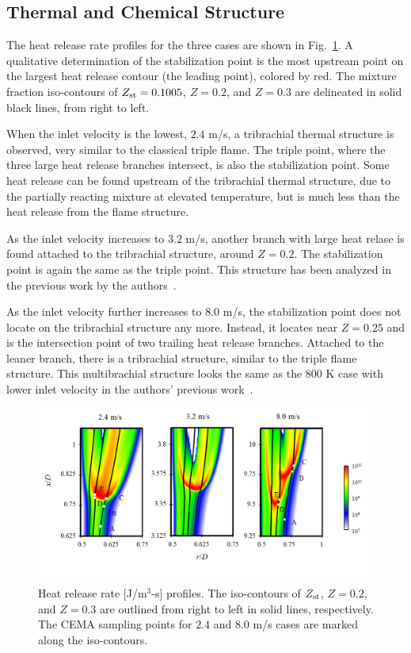 \documentclass{wssci}
\begin{document}
\subsection{Thermal and Chemical Structure}  
The heat release rate profiles for the three cases are shown in Fig.~\ref{fig:HRR_V}.  A qualitative determination of the stabilization point is the most upstream point on the largest heat release contour (the leading point), colored by red.  The mixture fraction iso-contours of $Z_{\rm st} = 0.1005$, $Z = 0.2$, and $Z = 0.3$ are delineated in solid black lines, from right to left.

When the inlet velocity is the lowest, $2.4$ m/s, a tribrachial thermal structure is observed, very similar to the classical triple flame.  The triple point, where the three large heat release branches intersect, is also the stabilization point.  Some heat release can be found upstream of the tribrachial thermal structure, due to the partially reacting mixture at elevated temperature, but is much less than the heat release from the flame structure. 

As the inlet velocity increases to $3.2$ m/s, another branch with large heat relase is found attached to the tribrachial structure, around $Z = 0.2$.  The stabilization point is again the same as the triple point.  This structure has been analyzed in the previous work by the authors~\cite{deng15}.

As the inlet velocity further increases to $8.0$ m/s, the stabilization point does not locate on the tribrachial structure any more.  Instead, it locates near $Z = 0.25$ and is the intersection point of two trailing heat release branches.  Attached to the leaner branch, there is a tribrachial structure, similar to the triple flame structure.  This multibrachial structure looks the same as the $800$ K case with lower inlet velocity in the authors' previous work~\cite{deng15}.

\begin{figure}
  \centering
  \scriptsize
  \vspace{-0.1in}
  \includegraphics[width=1.0\textwidth]{HRR_V.png}
  \normalsize
  \vspace{-0.6in}
  \caption{Heat release rate [J/m$^3$-s] profiles.  The iso-contours of $Z_{\rm st}$, $Z = 0.2$, and $Z = 0.3$ are outlined from right to left in solid lines, respectively.  The CEMA sampling points for $2.4$ and $8.0$ m/s cases are marked along the iso-contours.}
  \label{fig:HRR_V}
\end{figure}
\end{document}
